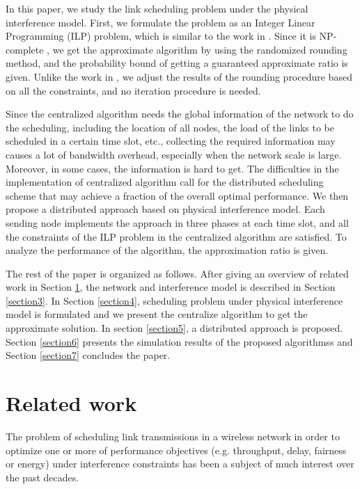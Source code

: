 \documentclass[conference]{IEEEtran}
\begin{document}
In this paper, we study the link scheduling problem under the
physical interference model. First, we formulate the problem as an
Integer Linear Programming (ILP) problem, which is similar to the
work in \cite{friderikos2006non}. Since it is NP-complete
\cite{goussevskaia2007complexity}, we get the approximate algorithm
by using the randomized rounding method, and the probability bound
of getting a guaranteed approximate ratio is given. Unlike the work
in \cite{friderikos2006non}, we adjust the results of the rounding
procedure based on all the constraints, and no iteration procedure
is needed.

Since the centralized algorithm needs the global information of the
network to do the scheduling, including the location of all nodes,
the load of the links to be scheduled in a certain time slot, etc.,
collecting the required information may causes a lot of bandwidth
overhead, especially when the network scale is large. Moreover, in
some cases, the information is hard to get. The difficulties in the
implementation of centralized algorithm call for the distributed
scheduling scheme that may achieve a fraction of the overall optimal
performance. We then propose a distributed approach based on
physical interference model. Each sending node implements the
approach in three phases at each time slot, and all the constraints
of the ILP problem in the centralized algorithm are satisfied. To
analyze the performance of the algorithm, the approximation ratio is
given.

The rest of the paper is organized as follows. After giving an
overview of related work in Section \ref{section2}, the network and
interference model is described in Section \ref{section3}. In
Section \ref{section4}, scheduling problem under physical
interference model is formulated and we present the centralize
algorithm to get the approximate solution. In section
\ref{section5}, a distributed approach is proposed. Section
\ref{section6} presents the simulation results of the proposed
algorithmss and Section \ref{section7} concludes the paper.















\section{Related work}\label{section2}
The problem of scheduling link transmissions in a wireless network
in order to optimize one or more of performance objectives (e.g.
throughput, delay, fairness or energy) under interference
constraints has been a subject of much interest over the past
decades.
\end{document}

